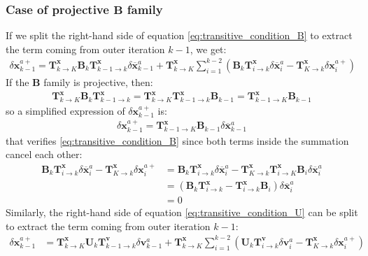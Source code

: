 \documentclass[12pt]{scrartcl}
\begin{document}
\subsubsection{Case of projective $\mathbf{B}$ family}
If we split the right-hand side of equation \eqref{eq:transitive_condition_B} to extract the term coming from outer iteration $k-1$, we get:
\begin{align}
\delta \mathbf{x}^{a+}_{k-1} = \mathbf{T}^\mathbf{x}_{k \rightarrow K} \mathbf{B}_k \mathbf{T}^\mathbf{x}_{k-1 \rightarrow k} \delta \overline{\mathbf{x}}^a_{k-1} + \mathbf{T}^\mathbf{x}_{k \rightarrow K} \sum_{i=1}^{k-2} \left(\mathbf{B}_k \mathbf{T}^\mathbf{x}_{i \rightarrow k} \delta \overline{\mathbf{x}}^a_i - \mathbf{T}^\mathbf{x}_{K \rightarrow k} \delta \mathbf{x}^{a+}_i\right)
\end{align}
If the $\mathbf{B}$ family is projective, then:
\begin{align}
\mathbf{T}^\mathbf{x}_{k \rightarrow K} \mathbf{B}_k \mathbf{T}^\mathbf{x}_{k-1 \rightarrow k} = \mathbf{T}^\mathbf{x}_{k \rightarrow K} \mathbf{T}^\mathbf{x}_{k-1 \rightarrow k} \mathbf{B}_{k-1} = \mathbf{T}^\mathbf{x}_{k-1 \rightarrow K} \mathbf{B}_{k-1}
\end{align}
so a simplified expression of $\delta \mathbf{x}^{a+}_{k-1}$ is:
\begin{align}
\label{eq:projective_condition_B}
\delta \mathbf{x}^{a+}_{k-1} = \mathbf{T}^\mathbf{x}_{k-1 \rightarrow K} \mathbf{B}_{k-1} \delta \overline{\mathbf{x}}^a_{k-1}
\end{align}
that verifies \eqref{eq:transitive_condition_B} since both terms inside the summation cancel each other:
\begin{align}
\mathbf{B}_k \mathbf{T}^\mathbf{x}_{i \rightarrow k} \delta \overline{\mathbf{x}}^a_i - \mathbf{T}^\mathbf{x}_{K \rightarrow k} \delta \mathbf{x}^{a+}_i & = \mathbf{B}_k \mathbf{T}^\mathbf{x}_{i \rightarrow k} \delta \overline{\mathbf{x}}^a_i - \mathbf{T}^\mathbf{x}_{K \rightarrow k}  \mathbf{T}^\mathbf{x}_{i \rightarrow K} \mathbf{B}_i \delta \overline{\mathbf{x}}^a_i \nonumber \\
& = \left(\mathbf{B}_k \mathbf{T}^\mathbf{x}_{i \rightarrow k} - \mathbf{T}^\mathbf{x}_{i \rightarrow k} \mathbf{B}_i \right) \delta \overline{\mathbf{x}}^a_i \nonumber \\
& = 0
\end{align}
Similarly, the right-hand side of equation \eqref{eq:transitive_condition_U} can be split to extract the term coming from outer iteration $k-1$:
\begin{align}
\delta \mathbf{x}^{a+}_{k-1} & = \mathbf{T}^\mathbf{x}_{k \rightarrow K} \mathbf{U}_k \mathbf{T}^\mathbf{v}_{k-1 \rightarrow k} \delta \mathbf{v}^a_{k-1} + \mathbf{T}^\mathbf{x}_{k \rightarrow K} \sum_{i=1}^{k-2} \left(\mathbf{U}_k \mathbf{T}^\mathbf{v}_{i \rightarrow k} \delta \mathbf{v}^a_i - \mathbf{T}^\mathbf{x}_{K \rightarrow k} \delta \mathbf{x}^{a+}_i\right)
\end{align}
\end{document}
